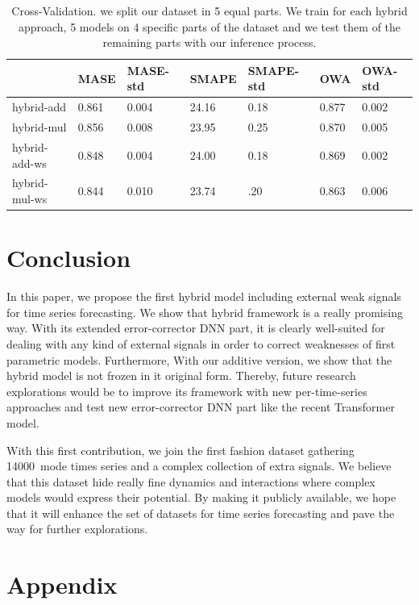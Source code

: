 \documentclass{article} %
\newcommand{\numberts}{14000}
\begin{document}
\begin{table}
  \caption{Cross-Validation. we split our dataset in 5 equal parts. We train for each hybrid approach, 5 models on 4 specific parts of the dataset and we test them of the remaining parts with our inference process.}
  \label{sample-table}
  \centering
  \begin{tabular}{lllllll}
    \hline
    &  MASE  & MASE-std & SMAPE & SMAPE-std & OWA & OWA-std \\
    \hline
     hybrid-add & 0.861  & 0.004 & 24.16 & 0.18 & 0.877 & 0.002 \\
     hybrid-mul & 0.856 & 0.008 & 23.95 & 0.25 & 0.870 & 0.005 \\
     hybrid-add-ws & 0.848 & 0.004 & 24.00 & 0.18 & 0.869 & 0.002 \\
     hybrid-mul-ws & 0.844 & 0.010 & 23.74 & .20 & 0.863 & 0.006 \\
    \hline
  \end{tabular}
\end{table}




\section{Conclusion}
\label{sec:discussion}
In this paper, we propose the first hybrid model including external weak signals for time series forecasting. We show that hybrid framework is a really promising way. With its extended error-corrector DNN part, it is clearly well-suited for dealing with any kind of external signals in order to correct weaknesses of first parametric models. Furthermore, With our additive version, we show that the hybrid model is not frozen in it original form. Thereby, future research explorations would be to improve its framework with new per-time-series approaches and test new error-corrector DNN part like the recent Transformer model.

With this first contribution, we join the first fashion dataset gathering \numberts\ mode times series and a complex collection of extra signals. We believe that this dataset hide really fine dynamics and interactions where complex models would express their potential. By making it publicly available, we hope that it will enhance the set of datasets for time series forecasting and pave the way for further explorations.





\appendix
\section{Appendix}
\end{document}
